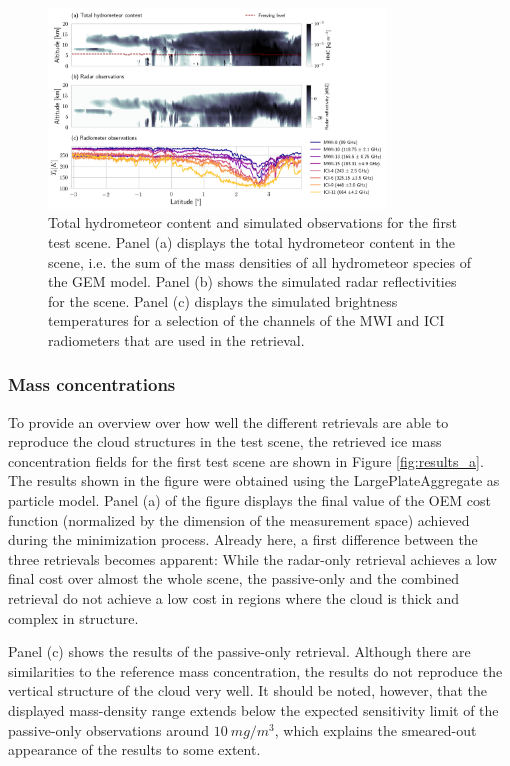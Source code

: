 \documentclass[journal abbreviation, manuscript]{copernicus}
\begin{document}
\begin{figure}
\centering
\includegraphics[width = 0.8\textwidth]{../plots/observations_a}
\caption{Total hydrometeor content and simulated observations for the first
  test scene. Panel (a) displays the total hydrometeor content in the scene,
  i.e. the sum of the mass densities of all hydrometeor species of the GEM
  model. Panel (b) shows the simulated radar reflectivities for the scene.
  Panel (c) displays the simulated brightness temperatures for a selection
  of the channels of the MWI and ICI radiometers that are used in the retrieval.}
\label{fig:observations_a}
\end{figure}

\subsubsection{Mass concentrations}

To provide an overview over how well the different retrievals are able to
reproduce the cloud structures in the test scene, the retrieved ice mass
concentration fields for the first test scene are shown in Figure
\ref{fig:results_a}. The results shown in the figure were obtained using the
LargePlateAggregate as particle model. Panel (a) of the figure displays the
final value of the OEM cost function (normalized by the dimension of the
measurement space) achieved during the minimization process. Already here, a
first difference between the three retrievals becomes apparent: While the
radar-only retrieval achieves a low final cost over almost the whole scene, the
passive-only and the combined retrieval do not achieve a low cost in regions
where the cloud is thick and complex in structure.

Panel (c) shows the results of the passive-only retrieval. Although there are
similarities to the reference mass concentration, the results do not reproduce
the vertical structure of the cloud very well. It should be noted, however, that
the displayed mass-density range extends below the expected sensitivity limit of
the passive-only observations around $10\ \unit{mg/m^3}$, which explains the
smeared-out appearance of the results to some extent.
\end{document}
